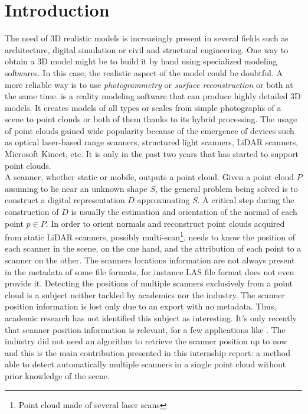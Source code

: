 \chapter{Introduction}
\label{ch:introduction}

The need of 3D realistic models is increasingly present in several fields such as architecture, digital simulation or civil and structural engineering. One way to obtain a 3D model might be to build it by hand using specialized modeling softwares. In this case, the realistic aspect of the model could be doubtful. A more reliable way is to use \emph{photogrammetry} or \emph{surface reconstruction} or both at the same time.
\CC is a reality modeling software that can produce highly detailed 3D  models. It creates models of all types or scales from simple photographs of a scene to point clouds or both of them thanks to its hybrid processing. The usage of point clouds gained wide popularity because of the emergence of devices such as optical laser-based range scanners, structured light scanners, LiDAR scanners, Microsoft Kinect, etc. It is only in the past two years that \CC has started to support point clouds.\\
A scanner, whether static or mobile, outputs a point cloud. Given a point cloud $P$ assuming to lie near an unknown shape $S$, the general problem being solved is to construct a digital representation $D$ approximating $S$. A critical step during the construction of $D$ is usually the estimation and orientation of the normal of each point $p \in P$. In order to orient normals and  reconstruct point clouds acquired from static LiDAR scanners, possibly multi-scan\footnote{Point cloud made of several laser scans}, \CC needs to know the position of each scanner in the scene, on the one hand, and the attribution of each point to a scanner on the other. The scanners locations information are not always present in the metadata of some file formats, for instance LAS file format does not even provide it. Detecting the positions of multiple scanners exclusively from a point cloud is a subject neither tackled by academics nor the industry. The scanner position information is lost only due to an export with no metadata. Thus, academic research has not identified this subject as interesting. It’s only recently that scanner position information is relevant, for a few applications like \CC. The industry did not need an algorithm to retrieve the scanner position up to now and this is the main contribution presented in this internship report: a method able to detect automatically multiple scanners in a single point cloud without prior knowledge of the scene.\\
